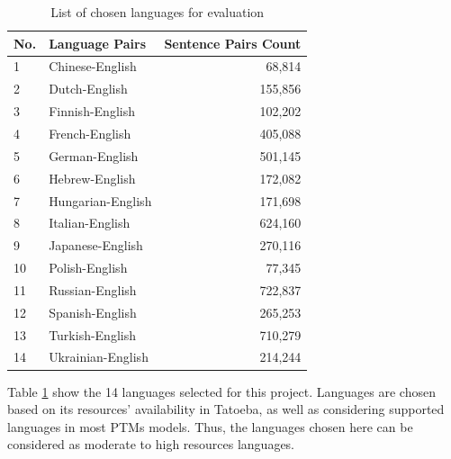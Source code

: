 \documentclass[a4paper]{article}
\begin{document}
\begin{table}[htbp]
    \centering
    \large
    \begin{tabular}{|l|l|r|}
        \hline
        \textbf{No.} & \textbf{Language Pairs} & \textbf{Sentence Pairs Count} \\
        \hline
        1            & Chinese-English         & 68,814                        \\
        2            & Dutch-English           & 155,856                       \\
        3            & Finnish-English         & 102,202                       \\
        4            & French-English          & 405,088                       \\
        5            & German-English          & 501,145                       \\
        6            & Hebrew-English          & 172,082                       \\
        7            & Hungarian-English       & 171,698                       \\
        8            & Italian-English         & 624,160                       \\
        9            & Japanese-English        & 270,116                       \\
        10           & Polish-English          & 77,345                        \\
        11           & Russian-English         & 722,837                       \\
        12           & Spanish-English         & 265,253                       \\
        13           & Turkish-English         & 710,279                       \\
        14           & Ukrainian-English       & 214,244                       \\
        \hline
    \end{tabular}
    \caption{List of chosen languages for evaluation}
    \label{table:eval_languages}
\end{table}

Table \ref{table:eval_languages} show the 14 languages selected for this project. Languages are chosen based on its resources' availability in Tatoeba, as well as considering supported languages in most PTMs models. Thus, the languages chosen here can be considered as moderate to high resources languages.
\end{document}

